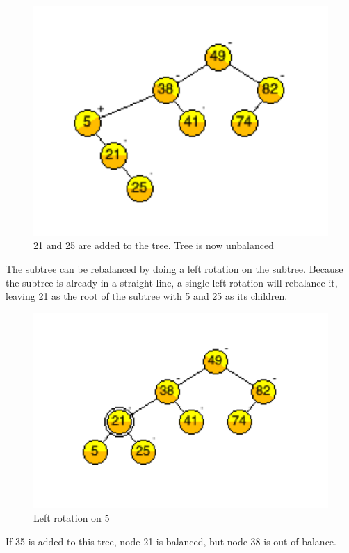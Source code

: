 \begin{figure}[H]
\centering
\includegraphics{pictures/tree7.png}
\caption{21 and 25 are added to the tree. Tree is now unbalanced}
\label{fig:tree7}
\end{figure}

The subtree  can be rebalanced by doing a left rotation on  the subtree.  Because the subtree is already in a straight line,  a single left rotation will rebalance it, leaving 21 as the root of the subtree with 5 and 25 as its children.

\begin{figure}[H]
\centering
\includegraphics{pictures/tree8.png}
\caption{Left rotation on 5}
\label{fig:tree8}
\end{figure}

If 35 is added to this tree, node 21 is balanced, but node 38 is out of balance.

